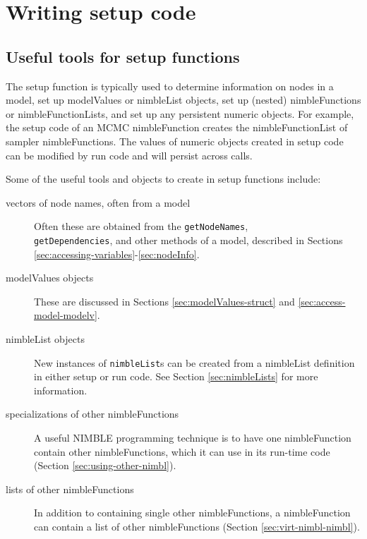 \documentclass[12pt,oneside]{book}\usepackage[]{graphicx}\usepackage[]{color}
\def\cd#1{\texttt{#1}}
\begin{document}
\section{Writing setup code}

\subsection{Useful tools for setup functions}

The setup function is typically used to determine information on nodes
in a model, set up modelValues or nimbleList objects, set up (nested) nimbleFunctions 
or nimbleFunctionLists, and set up any persistent numeric objects.
For example, the setup code of an MCMC nimbleFunction creates the
nimbleFunctionList of sampler nimbleFunctions.  The values of numeric
objects created in setup code can be modified by run code and will
persist across calls.

Some of the useful tools and objects to create in setup functions include:

\begin{description}
\item[vectors of node names, often from a model] Often these are obtained from the
  \cd{getNodeNames}, \\\cd{getDependencies}, and other methods of a model,
  described in Sections \ref{sec:accessing-variables}-\ref{sec:nodeInfo}.
\item[modelValues objects] These are discussed in Sections \ref{sec:modelValues-struct} and \ref{sec:access-model-modelv}.
\item[nimbleList objects]  New instances of \cd{nimbleList}s can
  be created from a nimbleList definition in either setup or run code. See Section \ref{sec:nimbleLists} for more information.
\item[specializations of other nimbleFunctions] A useful NIMBLE
  programming technique is to have one nimbleFunction contain other
  nimbleFunctions, which it can use in its run-time code (Section \ref{sec:using-other-nimbl}).
\item[lists of other nimbleFunctions] In addition to containing single
  other nimbleFunctions, a nimbleFunction can contain a list of other
  nimbleFunctions (Section \ref{sec:virt-nimbl-nimbl}).
\end{description}
\end{document}
